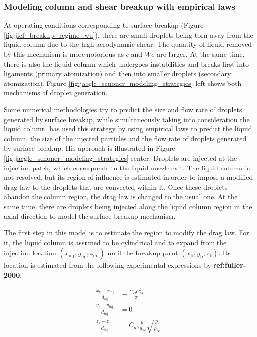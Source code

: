\subsubsection*{Modeling column and shear breakup with empirical laws }

At operating conditions corresponding to surface breakup (Figure \ref{fig:jicf_breakup_regime_wu}), there are small droplets being torn away from the liquid column due to the high aerodynamic shear. The quantity of liquid removed by this mechanism is more notorious as $q$ and $We$ are larger. At the same time, there is also the liquid column which undergoes instabilities and breaks first into ligaments (primary atomization) and then into smaller droplets (secondary atomization). Figure \ref{fig:jaegle_senoner_modeling_strategies} left shows both mechanisms of droplet generation.

Some numerical methodologies try to predict the size and flow rate of droplets generated by surface breakup, while simultaneously taking into consideration the liquid column.  has used this strategy by using empirical laws to predict the liquid column, the size of the injected particles and the flow rate of droplets generated by surface breakup. His approach is illustrated in Figure \ref{fig:jaegle_senoner_modeling_strategies} center. Droplets are injected at the injection patch, which corresponds to the liquid nozzle exit. The liquid column is not resolved, but its region of influence is estimated in order to impose a modified drag law to the droplets that are convected within it. Once these droplets abandon the column region, the drag law is changed to the usual one. At the same time, there are droplets being injected along the liquid column region in the axial direction to model the surface breakup mechanism.

The first step in this model is to estimate the region to modify the drag law. For it, the liquid column is assumed to be cylindrical and to expand from the injection location $\left( x_\mathrm{inj}, y_\mathrm{inj}, z_\mathrm{inj} \right)$ until the breakup point $\left( x_\mathrm{b}, y_\mathrm{b}, z_\mathrm{b} \right)$. Its location is estimated from the following experimental expressions by \textbf{ref:fuller-2000}:

\begin{subequations}
\label{eq:jaegle_breakup_point}
\begin{align}
\frac{x_b - x_\mathrm{inj}}{d_\mathrm{inj}} &= \frac{C_D C_{ab}^2}{\pi} \\
\frac{y_b - y_\mathrm{inj}}{d_\mathrm{inj}} &= 0 \\
\frac{z_b - z_\mathrm{inj}}{d_\mathrm{inj}} &= C_{ab} \frac{u_l}{u_\infty} \sqrt{\frac{\rho_l}{\rho_\infty}}
\end{align}
\end{subequations}

